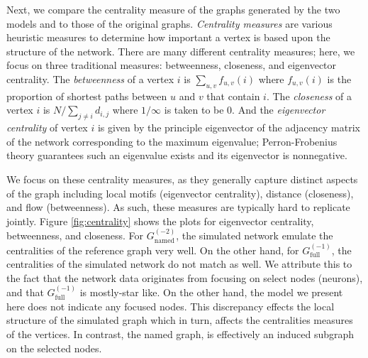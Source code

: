 \documentclass[11]{article}
\newcommand{\namedtwo}{G_{\textrm{named}}^{(-2)}}
\newcommand{\fullone}{G_{\textrm{full}}^{(-1)}}
\theoremstyle{remark}
\theoremstyle{definition}
\begin{document}
Next, we compare the centrality measure of the graphs generated by the two models and to those of the original graphs. {\it Centrality measures} are various heuristic measures to determine how important a vertex is based upon the structure of the network. There are many different centrality measures; here, we focus on three traditional measures: betweenness, closeness, and eigenvector centrality.  The {\it betweenness} of a vertex $i$ is $\sum_{u,v} f_{u,v}(i)$ where $f_{u,v}(i)$ is the proportion of shortest paths between $u$ and $v$ that contain $i$. The {\it closeness} of a vertex $i$ is $N / \sum_{j \ne i} d_{i,j}$ where $1/\infty$ is taken to be 0. And the {\it eigenvector centrality} of vertex $i$ is given by the principle eigenvector of the adjacency matrix of the network corresponding to the maximum eigenvalue; Perron-Frobenius theory guarantees such an eigenvalue exists and its eigenvector is nonnegative. 

We focus on these centrality measures, as they generally capture distinct aspects of the graph including local motifs (eigenvector centrality), distance (closeness), and flow (betweenness). As such, these measures are typically hard to replicate jointly. Figure \ref{fig:centrality} shows the plots for eigenvector centrality, betweenness, and closeness. For $\namedtwo$,  the simulated network emulate the centralities of the reference graph very well. On the other hand, for $\fullone$, the centralities of the simulated network do not match as well. We attribute this to the fact that the network data originates from focusing on select nodes (neurons), and that $\fullone$ is mostly-star like. On the other hand, the model we present here does not indicate any focused nodes. This discrepancy effects the local structure of the simulated graph which in turn, affects the centralities measures of the vertices. In contrast, the named graph, is effectively an induced subgraph on the selected nodes. 
\end{document}

